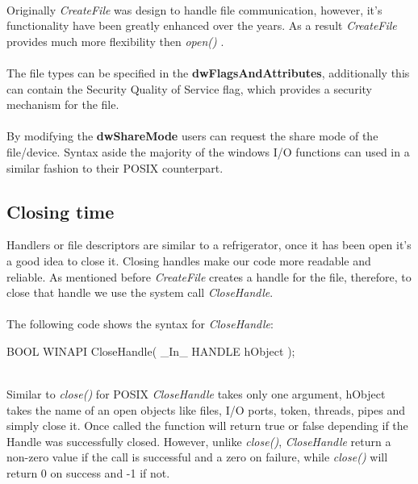 \documentclass[a4paper]{article}
\begin{document}
\\
Originally \textit{CreateFile} was design to handle file communication, however, it’s functionality have been greatly enhanced over the years. As a result \textit{CreateFile} provides much more flexibility then \textit{open()} . \\
\\
The file types can be specified in the 	\textbf{dwFlagsAndAttributes}, additionally this can contain the Security Quality of Service flag, which provides a security mechanism for the file.\\
\\
By modifying the \textbf{dwShareMode} users can request the share mode of the file/device. 
Syntax aside the majority of the windows I/O functions can used in a similar fashion to their POSIX counterpart.
\subsection{ Closing time}
Handlers or file descriptors are similar to a refrigerator, once it has been open it’s a good idea to close it. Closing handles make our code more readable and reliable. As mentioned before \textit{CreateFile} creates a handle for the file, therefore, to close that handle we use the system call \textit{CloseHandle}. \\
\\
The following code shows the syntax for \textit{CloseHandle}:\\
\begin{code}

BOOL WINAPI CloseHandle(
  	_In_  HANDLE hObject
); 

\end{code}\\
Similar to \textit{close()} for POSIX \textit{CloseHandle} takes only one argument, hObject takes the name of an open objects like files, I/O ports, token, threads, pipes and simply close it. Once called the function will return true or false depending if the Handle was successfully closed.  However, unlike \textit{close()}, \textit{CloseHandle} return a non-zero value if the call is successful and a zero on failure, while \textit{close()} will return 0 on success and -1 if not. 
\end{document}
